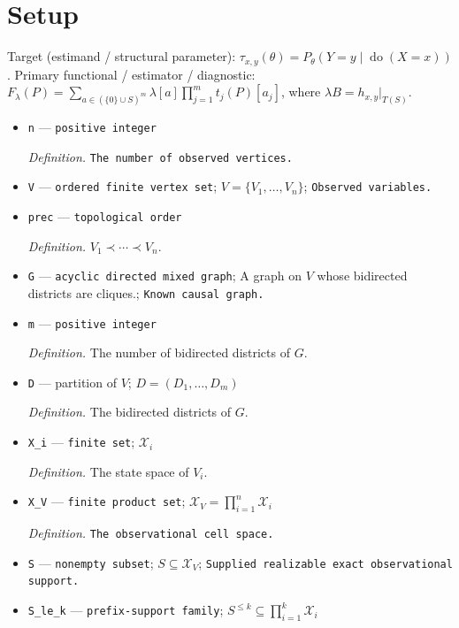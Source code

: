 \documentclass{article}
\begin{document}
\section{Setup}

Target (estimand / structural parameter): \(\tau_{x,y}(\theta)=P_{\theta}(Y=y\mid\operatorname{do}(X=x))\).
Primary functional / estimator / diagnostic: \(F_{\lambda}(P)=\sum_{a\in(\{0\}\cup S)^m}\lambda[a]\prod_{j=1}^m t_j(P)[a_j]\), where \(\lambda B=h_{x,y}|_{T(S)}\).
\begin{itemize}
  \item \texttt{n} --- \texttt{positive integer}
  \par\smallskip\noindent\emph{Definition.} \texttt{The number of observed vertices.}
  \item \texttt{V} --- \texttt{ordered finite vertex set}; \(V=\{V_1,\ldots,V_n\}\); \texttt{Observed variables.}
  \item \texttt{prec} --- \texttt{topological order}
  \par\smallskip\noindent\emph{Definition.} \(V_1\prec\cdots\prec V_n\).
  \item \texttt{G} --- \texttt{acyclic directed mixed graph}; A graph on \(V\) whose bidirected districts are cliques.; \texttt{Known causal graph.}
  \item \texttt{m} --- \texttt{positive integer}
  \par\smallskip\noindent\emph{Definition.} The number of bidirected districts of \(G\).
  \item \texttt{D} --- partition of \(V\); \(D=(D_1,\ldots,D_m)\)
  \par\smallskip\noindent\emph{Definition.} The bidirected districts of \(G\).
  \item \texttt{X\_\allowbreak{}i} --- \texttt{finite set}; \(\mathcal X_i\)
  \par\smallskip\noindent\emph{Definition.} The state space of \(V_i\).
  \item \texttt{X\_\allowbreak{}V} --- \texttt{finite product set}; \(\mathcal X_V=\prod_{i=1}^n\mathcal X_i\)
  \par\smallskip\noindent\emph{Definition.} \texttt{The observational cell space.}
  \item \texttt{S} --- \texttt{nonempty subset}; \(S\subseteq\mathcal X_V\); \texttt{Supplied realizable exact observational support.}
  \item \texttt{S\_\allowbreak{}le\_\allowbreak{}k} --- \texttt{prefix-\allowbreak{}support family}; \(S^{\le k}\subseteq\prod_{i=1}^k\mathcal X_i\)

\end{itemize}
\end{document}
